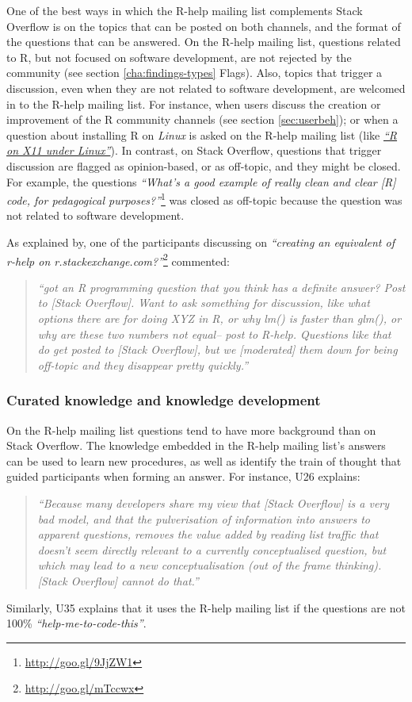 \documentclass{sig-alternate-05-2015}
\begin{document}
	One of the best ways in which the R-help mailing list complements Stack Overflow is on the topics that can be posted on both channels, and the format of the questions that can be answered. 
	On the R-help mailing list, questions related to R, but not focused on software development, are not rejected by the community (see section \ref{cha:findings-types} Flags).
	Also, topics that trigger a discussion, even when they are not related to software development, are welcomed in to the R-help mailing list.
	For instance, when users discuss the creation or improvement of the R community channels (see section \ref{sec:userbeh}); or when a question about installing R on \textit{Linux} is asked on the R-help mailing list (like {\href{http://goo.gl/1JLOUF}{\textit{``R on X11 under Linux''}}}).
	In contrast, on Stack Overflow, questions that trigger discussion are flagged as opinion-based, or as off-topic, and they might be closed. 
	For example, the questions \textit{``What's a good example of really clean and clear [R] code, for pedagogical purposes?''}\footnote{\url{http://goo.gl/9JjZW1}} was closed as off-topic because the question was not related to software development.


	As explained by, one of the participants discussing on \textit{``creating an equivalent of r-help on r.stackexchange.com?''}\footnote{\url{http://goo.gl/mTccwx}} commented:
	\begin{quote}
	    \textit{``got an R programming question that you think has a definite answer? Post to [Stack Overflow]. Want to ask something for discussion, like what options there are for doing XYZ in R, or why lm() is faster than glm(), or why are these two numbers not equal-- post to R-help. Questions like that do get posted to [Stack Overflow], but we [moderated] them down for being off-topic and they disappear pretty quickly.''}
    \end{quote}


	\subsubsection{Curated knowledge and knowledge development}

	On the R-help mailing list questions tend to have more background than on Stack Overflow.
	The knowledge embedded in the R-help mailing list's answers can be used to learn new procedures, as well as identify the train of thought that guided participants when forming an answer.
	For instance, U26 explains:
    \begin{quote}
	    \textit{``Because many developers share my view that [Stack Overflow] is a very bad model, and that the pulverisation of information into answers to apparent questions, removes the value added by reading list traffic that doesn't seem directly relevant to a currently conceptualised question, but which may lead to a new conceptualisation (out of the frame thinking). [Stack Overflow] cannot do that.''}
    \end{quote}
	Similarly, U35 explains that it uses the R-help mailing list if the questions are not 100\% \textit{``help-me-to-code-this''}.
\end{document}
